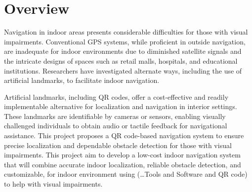 \section{Overview}
Navigation in indoor areas presents considerable difficulties for those with visual impairments. Conventional GPS systems, while proficient in outside navigation, are inadequate for indoor environments due to diminished satellite signals and the intricate designs of spaces such as retail malls, hospitals, and educational institutions. Researchers have investigated alternate ways, including the use of artificial landmarks, to facilitate indoor navigation.

Artificial landmarks, including QR codes, offer a cost-effective and readily implementable alternative for localization and navigation in interior settings. These landmarks are identifiable by cameras or sensors, enabling visually challenged individuals to obtain audio or tactile feedback for navigational assistance. This project proposes a QR code-based navigation system to ensure precise localization and dependable obstacle detection for those with visual impairments.
This project aim to develop a low-cost indoor navigation system that will combine accurate indoor localization, reliable obstacle detection, and customizable, for indoor environment using (…Tools and Software and QR code) to help with visual impairments. 


